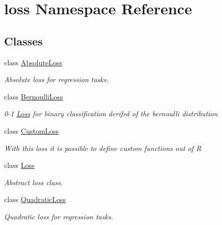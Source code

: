 \hypertarget{namespaceloss}{}\section{loss Namespace Reference}
\label{namespaceloss}
\subsection*{Classes}
\begin{DoxyCompactItemize}
\item 
class \mbox{\hyperlink{classloss_1_1_absolute_loss}{Absolute\+Loss}}
\begin{DoxyCompactList}\small\item\em Absolute loss for regression tasks. \end{DoxyCompactList}\item 
class \mbox{\hyperlink{classloss_1_1_bernoulli_loss}{Bernoulli\+Loss}}
\begin{DoxyCompactList}\small\item\em 0-\/1 \mbox{\hyperlink{classloss_1_1_loss}{Loss}} for binary classification derifed of the bernoulli distribution \end{DoxyCompactList}\item 
class \mbox{\hyperlink{classloss_1_1_custom_loss}{Custom\+Loss}}
\begin{DoxyCompactList}\small\item\em With this loss it is possible to define custom functions out of {\ttfamily R} \end{DoxyCompactList}\item 
class \mbox{\hyperlink{classloss_1_1_loss}{Loss}}
\begin{DoxyCompactList}\small\item\em Abstract loss class. \end{DoxyCompactList}\item 
class \mbox{\hyperlink{classloss_1_1_quadratic_loss}{Quadratic\+Loss}}
\begin{DoxyCompactList}\small\item\em Quadratic loss for regression tasks. \end{DoxyCompactList}\end{DoxyCompactItemize}
